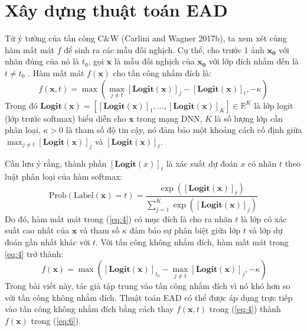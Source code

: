 \section{Xây dựng thuật toán EAD}

Từ ý tưởng của tấn công C\&W (Carlini and Wagner 2017b), ta xem xét cùng hàm mất mát $f$ để sinh 
ra các mẫu đối nghịch. Cụ thể, cho trước 1 ảnh $\mathbf{x_0}$ với nhãn đúng của nó là $t_0$, 
gọi $\mathbf{x}$ là mẫu đối nghịch của $\mathbf{x_0}$ với lớp đích nhắm đến là $t \neq t_0$ . Hàm mất mát 
$f(\mathbf{x})$ cho tấn công nhắm đích là:
\begin{equation}
    \label{eq:4}
    f(\mathbf{x}, t) = \max { \left( \max_{j \neq t} [\textbf{Logit}(\mathbf{x})]_j - 
    [\textbf{Logit}(\mathbf{x})]_t, -\kappa \right) }
\end{equation}
Trong đó $\textbf{Logit}(\mathbf{x}) = [[\textbf{Logit}(\mathbf{x})]_1, ..., 
[\textbf{Logit}(\mathbf{x})]_K] 
\in \mathbb{R}^K$ là lớp logit (lớp trước softmax) biểu diễn cho $\mathbf{x}$ trong mạng DNN, $K$
là số lượng lớp cần phân loại, $\kappa > 0$ là tham số độ tin cậy, nó đảm bảo một khoảng 
cách cố định giữa $\max_{j \neq t} [\textbf{Logit}(\mathbf{x})]_j$ và $[\textbf{Logit}(\mathbf{x})]_t$. 

Cần lưu ý rằng, thành phần $[\textbf{Logit}(x)]_t$ là xác suất dự đoán $x$ có nhãn $t$ theo 
luật phân loại của hàm softmax:
\begin{equation}
    \label{eq:5}
    \text{Prob}(\text{Label}(\mathbf{x}) = t) = \frac{\exp([\textbf{Logit}(\mathbf{x})]_t)}{
        \sum_{j=1}^{K} \exp([\textbf{Logit}(\mathbf{x})]_j)
    }
\end{equation}
Do đó, hàm mất mát trong (\ref{eq:4}) có mục đích là cho ra nhãn $t$ là 
lớp có xác suất cao nhất của $\mathbf{x}$ và tham số $\kappa$ đảm bảo sự phân biệt giữa lớp $t$
và lớp dự đoán gần nhất khác với $t$. Với tấn công không nhắm đích, hàm mất mát trong 
\ref{eq:4} trở thành:
\begin{equation}
    \label{eq:6}\
    f(\mathbf{x}) = \max { \left([\textbf{Logit}(\mathbf{x})]_{t_0} - 
    \max_{j \neq t} [\textbf{Logit}(\mathbf{x})]_j, -\kappa \right) }
\end{equation}
Trong bài viết này, tác giả tập trung vào tấn công nhắm đích vì nó khó hơn so với tấn công không 
nhắm đích. Thuật toán EAD có thể được áp dụng trực tiếp vào tấn công không nhắm đích bằng cách thay $f(\mathbf{x},t)$ trong (\ref{eq:4}) thành $f(\mathbf{x})$ trong (\ref{eq:6}). 

